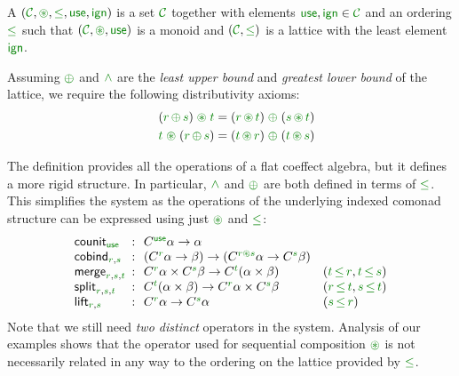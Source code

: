 \begin{definition}
A \emph{} $(\C, \cseq, \cleq, \cunit, \czero)$ is a set 
$\C$ together with elements $\cunit, \czero \in \C$ and an ordering $\cleq$ such 
that $(\C, \cseq, \cunit)$ is a monoid and $(\C, \cleq)$ is a lattice with the least 
element $\czero$. 

Assuming $\cpar$ and $\czip$ are the \emph{least upper bound} and \emph{greatest lower bound}
of the lattice, we require the following distributivity axioms:
%
\begin{align*}
\quad (\cclrd{r}\, \cpar\, \cclrd{s}) \;\cseq\; \cclrd{t} & = (\cclrd{r} \,\cseq\, \cclrd{t}) \;\cpar\; (\cclrd{s}\, \cseq\, \cclrd{t}) \\
\quad \cclrd{t} \;\cseq\; (\cclrd{r}\, \cpar\, \cclrd{s}) & = (\cclrd{t} \,\cseq\, \cclrd{r}) \;\cpar\; (\cclrd{t}\, \cseq\, \cclrd{s})
\end{align*}
\end{definition}

\noindent
The definition provides all the operations of a flat coeffect algebra, but it defines a more rigid 
structure. In particular, $\czip$ and $\cpar$ are both defined in terms of $\cleq$. This simplifies 
the system as the operations of the underlying indexed comonad structure can be expressed using just
$\cseq$ and $\cleq$:
%
\begin{equation*}
\begin{array}{lcll}
 \ident{counit}_{\cunit} &\narrow{:}& 
    \ctyp{\cunit}{\alpha} \rightarrow \alpha \\
 \ident{cobind}_{\cclrd{r}, \cclrd{s}} &\narrow{:}& 
    (\ctyp{\cclrd{r}}{\alpha} \rightarrow \beta) \rightarrow (\ctyp{\cclrd{r}\cseq\cclrd{s}}{\alpha} \rightarrow \ctyp{\cclrd{s}}{\beta}) \\
\ident{merge}_{\cclrd{r},\cclrd{s},\cclrd{t}} &\narrow{:}& 
    \ctyp{\cclrd{r}}{\alpha} \times \ctyp{\cclrd{s}}{\beta} \rightarrow \ctyp{\cclrd{t}}{(\alpha \times \beta)} &
    (\cclrd{t}\,\cleq\,\cclrd{r}, \cclrd{t}\,\cleq\,\cclrd{s}) \\
\ident{split}_{\cclrd{r},\cclrd{s},\cclrd{t}} &\narrow{:}& 
    \ctyp{\cclrd{t}}{(\alpha \times \beta)} \rightarrow \ctyp{\cclrd{r}}{\alpha} \times \ctyp{\cclrd{s}}{\beta} &
    (\cclrd{r}\,\cleq\,\cclrd{t}, \cclrd{s}\,\cleq\,\cclrd{t}) \\
\ident{lift}_{\cclrd{r},\cclrd{s}} &\narrow{:}& 
    \ctyp{\cclrd{r}}{\alpha} \rightarrow \ctyp{\cclrd{s}}{\alpha} & 
    (\cclrd{s}\,\cleq\,\cclrd{r})
\end{array}
\end{equation*}
%
Note that we still need \emph{two distinct} operators in the system. Analysis of our examples shows
that the operator used for sequential composition $\cseq$ is not necessarily related in any way to 
the ordering on the lattice provided by $\cleq$. 

